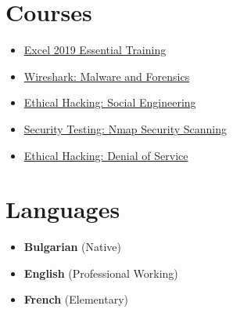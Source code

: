 \documentclass[letterpaper, 10pt]{article}
\begin{document}
	\begin{center}
		\begin{minipage}[t]{0.5\textwidth}
			\section*{Courses}
			\begin{itemize}
				\item \href{{}{https}://raw.githubusercontent.com/svetlyobg/LaTeX-CV/main/Excel%202019%20Essential%20Training.png}{Excel 2019 Essential Training}
				
				\item \href{{}{https}://raw.githubusercontent.com/svetlyobg/LaTeX-CV/main/Wireshark%20Malware%20and%20Forensics.png}{Wireshark: Malware and Forensics}
				
				\item \href{https://raw.githubusercontent.com/svetlyobg/LaTeX-CV/main/EthicalHackingSocialEngineering.png}{Ethical
					Hacking: Social Engineering}
				
				\item \href{https://raw.githubusercontent.com/svetlyobg/LaTeX-CV/main/SecurityTesting-NmapSecurityScanning.png}{Security
					Testing: Nmap Security Scanning}
				
				\item \href{https://raw.githubusercontent.com/svetlyobg/LaTeX-CV/main/EthicalHacking-DenialofService.png}{Ethical
					Hacking: Denial of Service}
			\end{itemize}
		\end{minipage}%
		\begin{minipage}[t]{0.5\textwidth}
			\section*{Languages}
			\begin{itemize}
				\item \textbf{Bulgarian} (Native)
				
				\item \textbf{English} (Professional Working)
				
				\item \textbf{French} (Elementary)
			\end{itemize}
			\newpage

\end{minipage}
\end{center}
\end{document}
